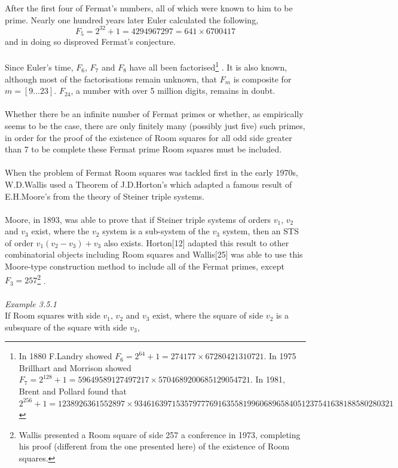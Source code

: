 \documentclass[
  12pt,
  a4paper]{book}
\begin{document}
After the first four of Fermat's numbers, all of which were known to him
to be prime. Nearly one hundred years later Euler calculated the
following, \[F_5 = 2^{32}+1=4294967297=641\times 6700417\] and in doing
so disproved Fermat's conjecture.\\
~\\
Since Euler's time, \(F_6\), \(F_7\) and \(F_8\) have all been
factorised\footnote{In 1880 F.Landry showed
  \(F_6=2^{64}+1=274177 \times 67280421310721\). In 1975 Brillhart and
  Morrison showed
  \(F_7=2^{128}+1=59649589127497217 \times 5704689200685129054721\). In
  1981, Brent and Pollard found that\\
  \(2^{256}+1=1238926361552897 \times 93461639715357977769163558199606896584051237541638188580280321\)}
. It is also known, although most of the factorisations remain unknown,
that \(F_m\) is composite for \(m=[9...23]\). \(F_{24}\), a number with
over 5 million digits, remains in doubt.\\
~\\
Whether there be an infinite number of Fermat primes or whether, as
empirically seems to be the case, there are only finitely many (possibly
just five) such primes, in order for the proof of the existence of Room
squares for all odd side greater than 7 to be complete these Fermat
prime Room squares must be included.\\
~\\
When the problem of Fermat Room squares was tackled first in the early
1970s, W.D.Wallis used a Theorem of J.D.Horton's which adapted a famous
result of E.H.Moore's from the theory of Steiner triple systems.\\
~\\
Moore, in 1893, was able to prove that if Steiner triple systems of
orders \(v_1\), \(v_2\) and \(v_3\) exist, where the \(v_2\) system is a
sub-system of the \(v_3\) system, then an STS of order
\(v_1(v_2-v_3)+v_3\) also exists. Horton{[}12{]} adapted this result to
other combinatorial objects including Room squares and Wallis{[}25{]}
was able to use this Moore-type construction method to include all of
the Fermat primes, except \(F_3=257\)\footnote{Wallis presented a Room
  square of side 257 a conference in 1973, completing his proof
  (different from the one presented here) of the existence of Room
  squares.} .\\
~\\
\emph{Example 3.5.1}\\
If Room squares with side \(v_1\), \(v_2\) and \(v_3\) exist, where the
square of side \(v_2\) is a subsquare of the square with side \(v_3\),
\end{document}
